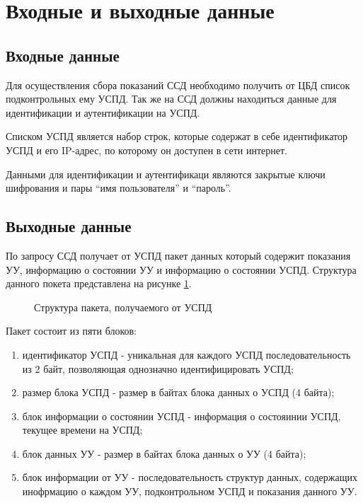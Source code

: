 \newpage
\section{Входные и выходные данные}
\setcounter{figure}{0}

\subsection{Входные данные}
Для осуществления сбора показаний ССД необходимо получить от ЦБД список подконтрольных ему УСПД. Так же на ССД должны находиться данные для идентификации и аутентификации на УСПД. 

Списком УСПД является набор строк, которые содержат в себе идентификатор УСПД и его IP-адрес, по которому он доступен в сети интернет. 

Данными для идентификации и аутентификаци являются закрытые ключи шифрования и пары ``имя пользователя'' и ``пароль''.


\subsection{Выходные данные}

По запросу ССД получает от УСПД пакет данных который содержит показания УУ, информацию о состоянии УУ и информацию о состоянии УСПД. Структура данного покета представлена на рисунке \ref{img:answer_struct}.

\begin{figure}[!ht]
 \caption{Структура пакета, получаемого от УСПД}
 \label{img:answer_struct}
\end{figure}

Пакет состоит из пяти блоков:

\begin{enumerate}
 \item идентификатор УСПД - уникальная для каждого УСПД последовательность из 2 байт, позволяющая однозначно идентифицировать УСПД;
 \item размер блока УСПД - размер в байтах блока данных о УСПД (4 байта);
 \item блок информации о состоянии УСПД - информация о состояинии УСПД, текущее времени на УСПД;
 \item блок данных УУ - размер в байтах блока данных о УУ (4 байта);
 \item блок информации от УУ - последовательность структур данных, содержащих инофрмацию о каждом УУ, подконтрольном УСПД и показания данного УУ.
\end{enumerate}

